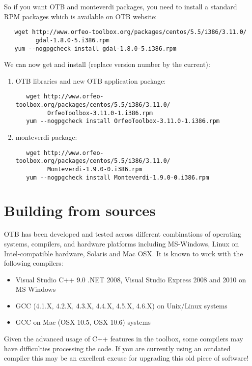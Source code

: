 So if you want OTB and monteverdi packages, you need to install a standard RPM packages which is available on OTB website: 
   \begin{verbatim}
   wget http://www.orfeo-toolbox.org/packages/centos/5.5/i386/3.11.0/
         gdal-1.8.0-5.i386.rpm
   yum --nogpgcheck install gdal-1.8.0-5.i386.rpm
   \end{verbatim}
We can now get and install (replace version number by the current):

\begin{enumerate}
\item OTB libraries and new OTB application package: 
   \begin{verbatim}
   wget http://www.orfeo-toolbox.org/packages/centos/5.5/i386/3.11.0/
         OrfeoToolbox-3.11.0-1.i386.rpm
   yum --nogpgcheck install OrfeoToolbox-3.11.0-1.i386.rpm
   \end{verbatim}
\item monteverdi package:
   \begin{verbatim}
   wget http://www.orfeo-toolbox.org/packages/centos/5.5/i386/3.11.0/
         Monteverdi-1.9.0-0.i386.rpm
   yum --nogpgcheck install Monteverdi-1.9.0-0.i386.rpm
   \end{verbatim}
\end{enumerate}


\section{Building from sources}
\label{sec:source}
OTB has been developed and tested across different combinations of
operating systems, compilers, and hardware platforms including
MS-Windows, Linux on Intel-compatible hardware, Solaris and Mac
OSX.  It is known to work with the following compilers:
\begin{itemize}
\item Visual Studio C++ 9.0 .NET 2008, Visual Studio Express 2008 and 2010 on MS-Windows
\item GCC (4.1.X, 4.2.X, 4.3.X, 4.4.X, 4.5.X, 4.6.X) on Unix/Linux systems
\item GCC on Mac (OSX 10.5, OSX 10.6) systems
\end{itemize}

Given the advanced usage of C++ features in the toolbox, some
compilers may have difficulties processing the code. If you are
currently using an outdated compiler this may be an excellent excuse
for upgrading this old piece of software!

